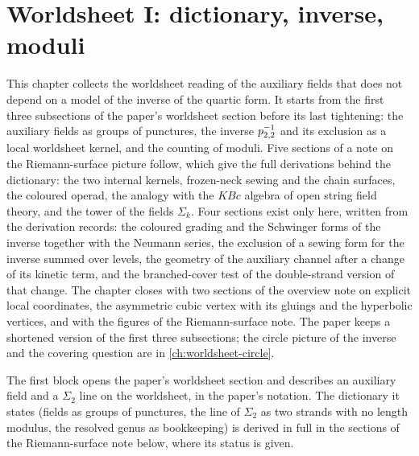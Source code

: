 \section{Worldsheet I: dictionary, inverse, moduli}
\label{ch:worldsheet-dictionary}

This chapter collects the worldsheet reading of the auxiliary fields that does not depend on a model of the inverse of the quartic form.
It starts from the first three subsections of the paper's worldsheet section before its last tightening: the auxiliary fields as groups of punctures, the inverse $p_{2,2}^{-1}$ and its exclusion as a local worldsheet kernel, and the counting of moduli.
Five sections of a note on the Riemann-surface picture follow, which give the full derivations behind the dictionary: the two internal kernels, frozen-neck sewing and the chain surfaces, the coloured operad, the analogy with the $KBc$ algebra of open string field theory, and the tower of the fields $\Sigma_k$.
Four sections exist only here, written from the derivation records: the coloured grading and the Schwinger forms of the inverse together with the Neumann series, the exclusion of a sewing form for the inverse summed over levels, the geometry of the auxiliary channel after a change of its kinetic term, and the branched-cover test of the double-strand version of that change.
The chapter closes with two sections of the overview note on explicit local coordinates, the asymmetric cubic vertex with its gluings and the hyperbolic vertices, and with the figures of the Riemann-surface note.
The paper keeps a shortened version of the first three subsections; the circle picture of the inverse and the covering question are in \cref{ch:worldsheet-circle}.

\medskip

The first block opens the paper's worldsheet section and describes an auxiliary field and a $\Sigma_2$ line on the worldsheet, in the paper's notation.
The dictionary it states (fields as groups of punctures, the line of $\Sigma_2$ as two strands with no length modulus, the resolved genus as bookkeeping) is derived in full in the sections of the Riemann-surface note below, where its status is given.



